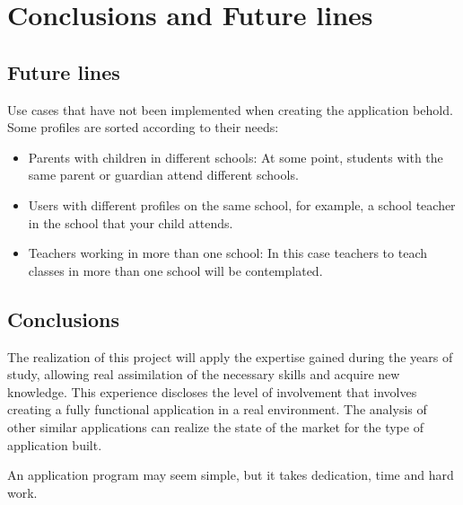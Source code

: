 %
%
%
%

\cleardoublepage
\chapter{Conclusions and Future lines}
\label{chap:futureLines}

	\section{Future lines}
	
		Use cases that have not been implemented when creating the application behold. Some profiles are sorted according to their needs:
		
		\begin{itemize}
			\item Parents with children in different schools: At some point, students with the same parent or guardian attend different schools.
			\item Users with different profiles on the same school, for example, a school teacher in the school that your child attends.
			\item Teachers working in more than one school: In this case teachers to teach classes in more than one school will be contemplated.
		\end{itemize}
	
	\section{Conclusions}
		The realization of this project will apply the expertise gained during the years of study, allowing real assimilation of the necessary skills and acquire new knowledge.
		This experience discloses the level of involvement that involves creating a fully functional application in a real environment. The analysis of other similar applications can realize the state of the market for the type of application built.
		
		\bigskip
		An application program may seem simple, but it takes dedication, time and hard work.